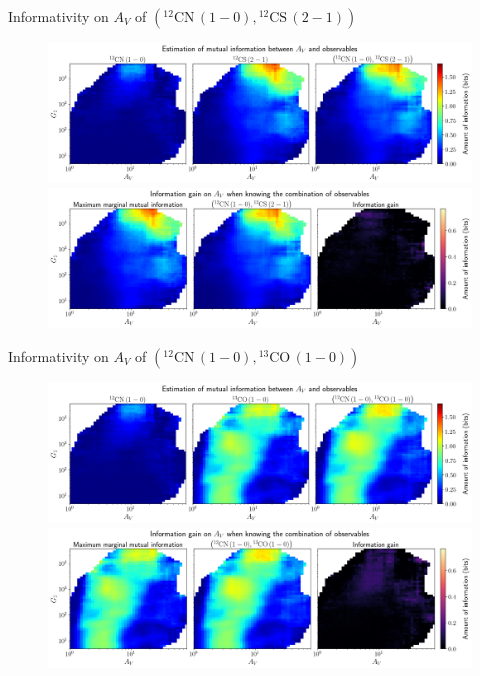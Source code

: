 \documentclass{beamer}
\begin{document}
\begin{frame}{Informativity on $A_V$ of $\left(\mathrm{^{12}CN\,(1-0)},\mathrm{^{12}CS\,(2-1)}\right)$}
    \begin{figure}
        \centering
        \includegraphics[width=0.95\linewidth]{../mi/av__12cn10_12cs21_mi.png}
        \vfill
        \includegraphics[width=0.95\linewidth]{../mi/av__12cn10_12cs21_mi_gain.png}
    \end{figure}
\end{frame}

\begin{frame}{Informativity on $A_V$ of $\left(\mathrm{^{12}CN\,(1-0)},\mathrm{^{13}CO\,(1-0)}\right)$}
    \begin{figure}
        \centering
        \includegraphics[width=0.95\linewidth]{../mi/av__12cn10_13co10_mi.png}
        \vfill
        \includegraphics[width=0.95\linewidth]{../mi/av__12cn10_13co10_mi_gain.png}
    \end{figure}
\end{frame}
\end{document}

